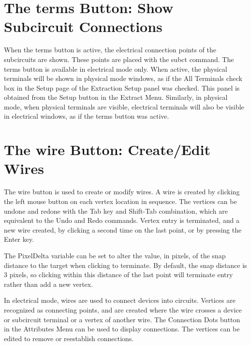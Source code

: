 \section{The {\cb terms} Button: Show Subcircuit Connections}

When the {\cb terms} button is active, the electrical connection
points of the subcircuits are shown.  These points are placed with the
{\cb subct} command.  The {\cb terms} button is available in
electrical mode only.  When active, the physical terminals will be
shown in physical mode windows, as if the {\cb All Terminals} check
box in the {\cb Setup} page of the {\cb Extraction Setup} panel was
checked.  This panel is obtained from the {\cb Setup} button in the
{\cb Extract Menu}.  Similarly, in physical mode, when physical
terminals are visible, electrical terminals will also be visible in
electrical windows, as if the {\cb terms} button was active.


\section{The {\cb wire} Button: Create/Edit Wires}

The {\cb wire} button is used to create or modify wires.  A wire is
created by clicking the left mouse button on each vertex location in
sequence.  The vertices can be undone and redone with the {\kb Tab}
key and {\kb Shift-Tab} combination, which are equivalent to the {\cb
Undo} and {\cb Redo} commands.  Vertex entry is terminated, and a new
wire created, by clicking a second time on the last point, or by
pressing the {\kb Enter} key.

The {\et PixelDelta} variable can be set to alter the value, in
pixels, of the snap distance to the target when clicking to terminate. 
By default, the snap distance is 3 pixels, so clicking within this
distance of the last point will terminate entry rather than add a
new vertex.

In electrical mode, wires are used to connect devices into circuits. 
Vertices are recognized as connecting points, and are created where
the wire crosses a device or subcircuit terminal or a vertex of
another wire.  The {\cb Connection Dots} button in the {\cb Attributes
Menu} can be used to display connections.  The vertices can be edited
to remove or reestablish connections.

